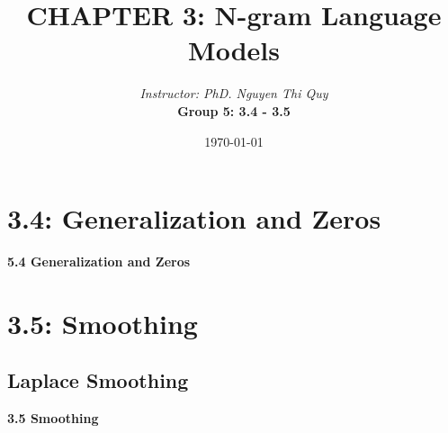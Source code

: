 \documentclass[13.5pt,aspecratio=169]{beamer}
\title{CHAPTER 3: N-gram Language Models}
\author[Group 5]{\textit{Instructor: PhD. Nguyen Thi Quy}\\ \bigskip \textbf{Group 5: 3.4 - 3.5}}
\date{\today}
\begin{document}
\maketitle


\section{3.4: Generalization and Zeros}

\begin{frame}
    \bigskip
    \color{blue} \Huge \textbf{5.4 Generalization and Zeros} 
\end{frame}


\section{3.5: Smoothing} %
\subsection{Laplace Smoothing}
\begin{frame}
    \bigskip
    \color{blue} \Huge \textbf{3.5 Smoothing} 
\end{frame}

\end{document}
